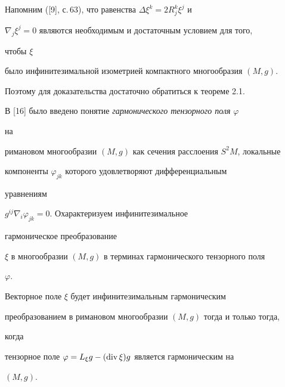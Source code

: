  


\begin{pf} 


Напомним ([9], с.\,63), что равенства $\Delta\xi^k=2R^k_j\xi^j$ и 


$\nabla_j\xi^j=0$ являются необходимым и достаточным условием для того, 


чтобы $\xi$ 


было инфинитезимальной изометрией компактного многообразия $(M,g)$. 


Поэтому для доказательства достаточно обратиться к теореме 2.1. 


\end{pf} 


 


В [16] было введено понятие {\it гармонического тензорного поля} $\varphi$ 


на 


римановом многообразии $(M,g)$ как сечения расслоения $S^2M$, локальные 


компоненты $\varphi_{jk}$ которого удовлетворяют дифференциальным 


уравнениям 


$g^{ij}\nabla_i\varphi_{jk}=0$. Охарактеризуем инфинитезимальное 


гармоническое преобразование 


$\xi$ в многообразии $(M,g)$ в терминах гармонического тензорного поля 


$\varphi$. 


 


\begin{thms} 


Векторное поле $\xi$ будет инфинитезимальным гармоническим 


преобразованием в римановом многообразии $(M,g)$ тогда и только тогда, 


когда 


тензорное поле $\varphi=L_\xi g-(\operatorname{div}\xi)g$ является гармоническим на 


$(M,g)$. 


\end{thms} 


 


